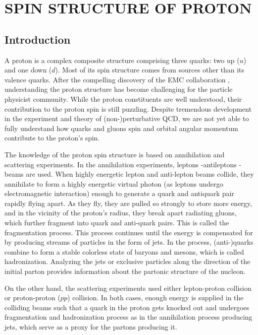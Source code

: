 \chapter{SPIN STRUCTURE OF PROTON}

\section{Introduction}

A proton is a complex composite structure comprising three quarks: two up ($u$) and one down ($d$). Most of its spin structure comes from sources other than its valence quarks. After the compelling discovery of the EMC collaboration \cite{EuropeanMuon:1987isl}, understanding the proton structure has become challenging for the particle physicist community. While the proton constituents are well understood, their contribution to the proton spin is still puzzling. Despite tremendous development in the experiment and theory of (non-)perturbative QCD, we are not yet able to fully understand how quarks and gluons spin and orbital angular momentum contribute to the proton's spin. 

The knowledge of the proton spin structure is based on annihilation and scattering experiments. In the annihilation experiments, leptons -antileptons - beams are used. When highly energetic lepton and anti-lepton beams collide, they annihilate to form a highly energetic virtual photon (as leptons undergo electromagnetic interaction) enough to generate a quark and antiquark pair rapidly flying apart. As they fly, they are pulled so strongly to store more energy, and in the vicinity of the proton's radius, they break apart radiating gluons, which further fragment into quark and anti-quark pairs. This is called the fragmentation process. This process continues until the energy is compensated for by producing streams of particles in the form of jets. In the process, (anti-)quarks combine to form a stable colorless state  of baryons and mesons, which is called hadronization. Analyzing the jets or exclusive particles along the direction of the initial parton provides information about the partonic structure of the nucleon. 

On the other hand, the scattering experiments used either lepton-proton collision or proton-proton ($pp$) collision. In both cases, enough energy is supplied in the colliding beams such that a quark in the proton gets knocked out and undergoes fragmentation and hadronization process as in the annihilation process producing jets, which serve as a proxy for the partons producing it.  

